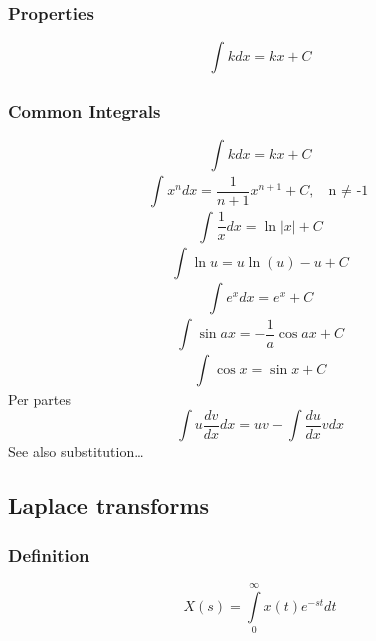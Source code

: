 \documentclass{article}
\begin{document}
		\subsubsection{Properties}
			\begin{equation}
				\int_{}^{}k dx = kx + C
			\end{equation}
		\subsubsection{Common Integrals}
			\begin{equation}
				\int_{}^{}k dx = kx + C
			\end{equation}
			\begin{equation}
				\int_{}^{}x^n dx = \frac{1}{n+1} x^{n+1} + C, \ \ \ \mbox{n $\neq$ -1}
			\end{equation}
			\begin{equation}
				\int_{}^{}\frac{1}{x} dx = \ln|x| + C
			\end{equation}
			\begin{equation}
				\int_{}^{}\ln u = u\ln(u)-u+C
			\end{equation}
			\begin{equation}
				\int_{}^{}e^x dx = e^x+C
			\end{equation}
			\begin{equation}
				\int_{}^{}\sin ax = -\frac{1}{a}\cos ax+C
			\end{equation}
			\begin{equation}
				\int_{}^{}\cos x = \sin x+C
			\end{equation}
			Per partes
			\begin{equation}
				\int {u\frac{{dv}}{{dx}}} dx = uv - \int {\frac{{du}}{{dx}}} vdx
			\end{equation}
			See also substitution\ldots
	\subsection{Laplace transforms}
		\subsubsection{Definition}
			\begin{equation}
				X(s) = \int\limits_0^\infty {x(t)e^{ - st} dt}
			\end{equation}
\end{document}
